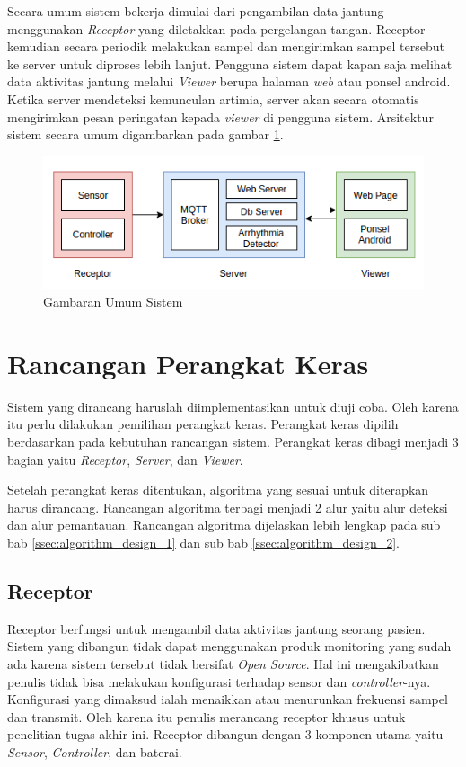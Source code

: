 Secara umum sistem bekerja dimulai dari pengambilan data jantung menggunakan \textit{Receptor} yang diletakkan pada pergelangan tangan. Receptor kemudian secara periodik melakukan sampel dan mengirimkan sampel tersebut ke server untuk diproses lebih lanjut. Pengguna sistem dapat kapan saja melihat data aktivitas jantung melalui \textit{Viewer} berupa halaman \textit{web} atau ponsel android. Ketika server mendeteksi kemunculan artimia, server akan secara otomatis mengirimkan pesan peringatan kepada \textit{viewer} di pengguna sistem. Arsitektur sistem secara umum digambarkan pada gambar \ref{gambar_umum}.

\begin{figure}[H]
	\centering
	\includegraphics[scale=0.8]{images/gambar_umum.png}
    \caption{Gambaran Umum Sistem}
	\label{gambar_umum}
\end{figure}

\section{Rancangan Perangkat Keras}
Sistem yang dirancang haruslah diimplementasikan untuk diuji coba. Oleh karena itu perlu dilakukan pemilihan perangkat keras. Perangkat keras dipilih berdasarkan pada kebutuhan rancangan sistem. Perangkat keras dibagi menjadi 3 bagian yaitu \textit{Receptor}, \textit{Server}, dan \textit{Viewer}.

Setelah perangkat keras ditentukan, algoritma yang sesuai untuk diterapkan harus dirancang. Rancangan algoritma terbagi menjadi 2 alur yaitu alur deteksi dan alur pemantauan. Rancangan algoritma dijelaskan lebih lengkap pada sub bab \ref{ssec:algorithm_design_1} dan sub bab \ref{ssec:algorithm_design_2}.

\subsection{Receptor}
Receptor berfungsi untuk mengambil data aktivitas jantung seorang pasien. Sistem yang dibangun tidak dapat menggunakan produk monitoring yang sudah ada karena sistem tersebut tidak bersifat \textit{Open Source}. Hal ini mengakibatkan penulis tidak bisa melakukan konfigurasi terhadap sensor dan \textit{controller}-nya. Konfigurasi yang dimaksud ialah menaikkan atau menurunkan frekuensi sampel dan transmit. Oleh karena itu penulis merancang receptor khusus untuk penelitian tugas akhir ini. Receptor dibangun dengan 3 komponen utama yaitu \textit{Sensor}, \textit{Controller}, dan baterai.

